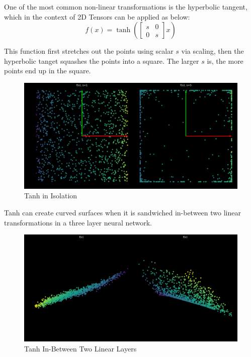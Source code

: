 One of the most common non-linear transformations is the hyperbolic tangent, which in the context of 2D Tensors can be applied as below:
\[f(x) = \tanh(
\begin{bmatrix}
s & 0\\
0 & s
\end{bmatrix}
x)\]

This function first stretches out the points using scalar $s$ via scaling, then the hyperbolic tanget squashes the points into a square.
The larger $s$ is, the more points end up in the square.

\begin{figure}[H]
\begin{center}
\includegraphics[width=400pt]{figs/tanh.png}
\end{center} 
\caption{Tanh in Isolation}
\end{figure}

Tanh can create curved surfaces when it is sandwiched in-between two linear transformations in a three layer neural network.

\begin{figure}[H]
\begin{center}
\includegraphics[width=400pt]{figs/tanh_sandwich.png}
\end{center} 
\caption{Tanh In-Between Two Linear Layers}
\end{figure}
